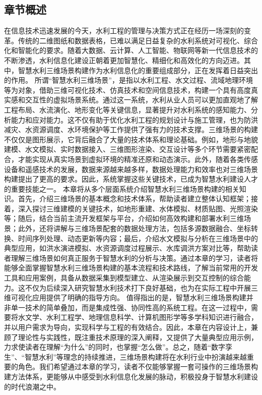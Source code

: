 {{\subsection{章节概述}\label{ux7ae0ux8282ux6982ux8ff0}
在信息技术迅速发展的今天，水利工程的管理与决策方式正在经历一场深刻的变革。传统的二维图纸和数据表格，已难以满足日益复杂的水利系统对可视化、综合化和智能化的要求。随着大数据、云计算、人工智能、物联网等新一代信息技术的不断渗透，水利信息化建设正朝着更加智慧化、精细化和高效化的方向迈进。其中，智慧水利三维场景构建作为水利信息化的重要组成部分，正在发挥着日益突出的作用。
所谓``智慧水利三维场景''，是指以水利工程、水文过程、流域地理环境等为对象，借助三维可视化技术、仿真技术和空间信息技术，构建一个具有高度真实感和交互性的虚拟场景系统。通过这一系统，水利从业人员可以更加直观地了解工程布局、水流演化、地形变化等关键信息，显著提升对水利系统的感知能力、分析能力和应对能力。这不仅有助于优化水利工程的规划设计与施工管理，也为防洪减灾、水资源调度、水环境保护等工作提供了强有力的技术支撑。三维场景的构建不仅仅是图形展示，它背后融合了大量的技术体系和理论基础。例如，地形与地貌建模、水文模拟、实时数据接入、三维图形渲染、交互设计等多个环节需要紧密配合，才能实现从真实场景到虚拟环境的精准还原和动态演示。此外，随着各类传感设备和遥感技术的发展，数据来源越来越多样，数据处理能力和效率也对三维场景构建提出了更高的要求。因此，系统掌握这些关键技术，已成为智慧水利建设人才的重要技能之一。
本章将从多个层面系统介绍智慧水利三维场景构建的相关知识。首先，介绍三维场景的基本概念和技术体系，帮助读者建立整体认知框架；接着，深入探讨三维建模的关键技术，如地形重建、水体模拟、材质贴图、光照渲染等；随后，结合当前主流开发框架与平台，介绍如何高效构建和部署水利三维场景；此外，还将讲解与三维场景配套的数据处理方法，包括多源数据融合、坐标转换、时间序列处理、动态更新等内容；最后，介绍水文模拟与分析在三维场景中的典型应用，如洪水演进模拟、水资源调度过程展示、水库调洪方案对比等，帮助读者理解三维场景如何真正服务于智慧水利的分析与决策。通过本章的学习，读者将能够全面掌握智慧水利三维场景构建的基本流程和技术路线，了解当前常用的开发工具和应用案例，具备从数据采集到模型建立、从渲染展示到交互控制的综合能力。这不仅为后续深入研究智慧水利技术打下良好基础，也为在实际工程中开展三维可视化应用提供了明确的指导方向。
值得指出的是，智慧水利三维场景构建并非单一技术的简单叠加，而是集成性强、协同性高的系统工程。在这一过程中，需要将水文学、水利工程学、地理信息科学、计算机图形学等多学科知识进行融合，并以用户需求为导向，实现科学与工程的有效结合。因此，本章在内容设计上，兼顾了理论性与实践性，既注重技术原理的深入阐释，又提供了大量典型应用示例，力求使读者在理解``为什么''的同时，也掌握``怎么做''。总之，随着``数字孪生''、``智慧水利''等理念的持续推进，三维场景构建将在水利行业中扮演越来越重要的角色。我们希望通过本章的学习，读者不仅能够掌握一套可操作的三维场景构建方法体系，更能够从中感受到水利信息化发展的脉动，积极投身于智慧水利建设的时代浪潮之中。
}}
